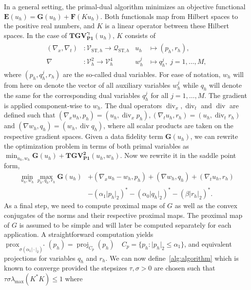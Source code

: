 \documentclass{article}
\DeclareMathOperator{\Div}{div}
\DeclareMathOperator*{\prox}{prox}
\newcommand{\proj}{\operatorname{proj}}
\begin{document}
	In a general setting, the primal-dual algorithm minimizes an objective functional $\mathbf{E}(u_h) = \mathbf{G}(u_h) + \mathbf{F}(Ku_h)$.
	Both functionals map from Hilbert spaces to the positive real numbers, and $K$ is a linear operator between these Hilbert spaces.
	In the case of $\mathbf{TGV_{P1}^\gamma}(u_h)$, $K$ consists of
	\begin{align*}
		\begin{aligned}
			(\nabla_x, \nabla_t)&:\mathcal{V}_{\text{ST}, h} \to \mathcal{Q}_{\text{ST}, h} &
			u_h &\mapsto (p_h, r_h),\\
			\nabla&: \mathcal{V}_h^2 \to \mathcal{V}_h^{4} &
			w_h^j &\mapsto q_h^j, \; j=1,\ldots, M,
		\end{aligned}
	\end{align*}
	where $(p_h, q_h^j, r_h)$ are the so-called dual variables.
	For ease of notation, $w_h$ will from here on denote the vector of all auxiliary variables $w^j_h$ while $q_h$ will denote the same for the corresponding dual variables $q^j_h$ for all $j=1, \ldots, M$.
	The gradient is applied component-wise to $w_h$.
	The dual operators $\Div_x, \Div_t$ and $\Div$ are defined such that $(\nabla_xu_h, p_h) = (u_h, \Div_x p_h), (\nabla_tu_h, r_h) = (u_h, \Div_t r_h)$ and $(\nabla w_h, q_h) = (w_h, \Div q_h)$, where all scalar products are taken on the respective gradient spaces.
	Given a data fidelity term $\mathbf{G}(u_h)$, we can rewrite the optimization problem in terms of both primal variables as $\min_{u_h,w_h}\mathbf{G}(u_h) +  \mathbf{TGV_{P1}^2}(u_h,w_h)$.
	Now we rewrite it in the saddle point form,
	\begin{align*}
		\min_{u_h,w_h} \max_{p_h, q_h, r_h} \mathbf{G}(u_h) &+ (\nabla_x u_h - w_h, p_h) + (\nabla w_h, q_h) + (\nabla_tu_h, r_h)\\ &- (\alpha_1\vert p_h\vert_2)^* - (\alpha_0\vert q_h\vert_2)^*- (\beta\vert r_h\vert_2)^*.
	\end{align*}
	As a final step, we need to compute proximal maps of $G$ as well as the convex conjugates of the norms and their respective proximal maps.
	The proximal map of $G$ is assumed to be simple and will later be computed separately for each application.
	A straightforward computation yields $\prox_{\sigma (\alpha_1\vert\cdot\vert_2)^*}(p_h) =\proj_{C_p}(p_h) \quad C_p=\lbrace p_h \colon \vert p_{h} \vert_2 \leq \alpha_1\rbrace$, and equivalent projections for variables $q_h$ and $r_h$.
	We can now define~\cref{alg:algorithm} which is known to converge provided the stepsizes $\tau, \sigma > 0$ are chosen such that $\tau\sigma\lambda_\mathrm{max}(K^*K)\leq 1$ where
\end{document}
